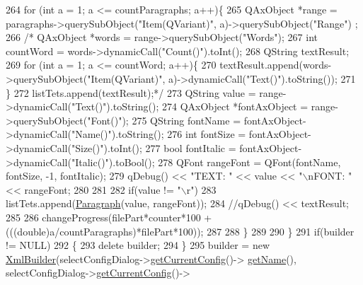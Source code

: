 \begin{DoxyCode}
264             \textcolor{keywordflow}{for} (\textcolor{keywordtype}{int} a = 1; a <= countParagraphs; a++)\{
265                 QAxObject *range = paragraphs->querySubObject(\textcolor{stringliteral}{"Item(QVariant)"}, a)->querySubObject(\textcolor{stringliteral}{"Range"})
      ;
266                 \textcolor{comment}{/* QAxObject *words = range->querySubObject("Words");}
267 \textcolor{comment}{                int countWord = words->dynamicCall("Count()").toInt();}
268 \textcolor{comment}{                QString textResult;}
269 \textcolor{comment}{                for (int a = 1; a <= countWord; a++)\{}
270 \textcolor{comment}{                    textResult.append(words->querySubObject("Item(QVariant)",
       a)->dynamicCall("Text()").toString());}
271 \textcolor{comment}{                \}}
272 \textcolor{comment}{                listTets.append(textResult);*/}
273                 QString value = range->dynamicCall(\textcolor{stringliteral}{"Text()"}).toString();
274                 QAxObject *fontAxObject = range->querySubObject(\textcolor{stringliteral}{"Font()"});
275                 QString fontName = fontAxObject->dynamicCall(\textcolor{stringliteral}{"Name()"}).toString();
276                 \textcolor{keywordtype}{int} fontSize = fontAxObject->dynamicCall(\textcolor{stringliteral}{"Size()"}).toInt();
277                 \textcolor{keywordtype}{bool} fontItalic = fontAxObject->dynamicCall(\textcolor{stringliteral}{"Italic()"}).toBool();
278                 QFont rangeFont = QFont(fontName, fontSize, -1, fontItalic);
279                 qDebug() << \textcolor{stringliteral}{"TEXT: "} << value << \textcolor{stringliteral}{"\(\backslash\)nFONT: "} << rangeFont;
280 
281 
282                 \textcolor{keywordflow}{if}(value != \textcolor{stringliteral}{"\(\backslash\)r"})
283                     listTets.append(\hyperlink{class_paragraph}{Paragraph}(value, rangeFont));
284                 \textcolor{comment}{//qDebug() << textResult;}
285 
286                 changeProgress(filePart*counter*100 + (((\textcolor{keywordtype}{double})a/countParagraphs)*filePart*100));
287 
288             \}
289 
290         \}
291         \textcolor{keywordflow}{if}(builder != NULL)
292         \{
293             \textcolor{keyword}{delete} builder;
294         \}
295         builder = \textcolor{keyword}{new} \hyperlink{class_xml_builder}{XmlBuilder}(selectConfigDialog->\hyperlink{class_select_parser_window_ab6397caf6e7270309a5b57befb3f144f}{getCurrentConfig}()->
      \hyperlink{class_parser_config_a0a9a65b537b8c7f4041d2b913c46fde7}{getName}(), selectConfigDialog->\hyperlink{class_select_parser_window_ab6397caf6e7270309a5b57befb3f144f}{getCurrentConfig}()->

\end{DoxyCode}
